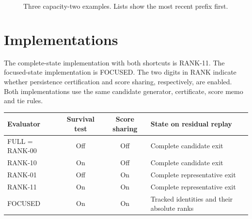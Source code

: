 \documentclass[11pt,letterpaper]{article}
\begin{document}
\begin{figure}[htbp]\centering
{}
\caption{Three capacity-two examples. Lists show the most recent prefix first.}\label{fig:counterexamples}
\end{figure}

\section{Implementations}

The complete-state implementation with both shortcuts is RANK-11. The focused-state implementation is FOCUSED. The two digits in RANK indicate whether persistence certification and score sharing, respectively, are enabled. Both implementations use the same candidate generator, certificate, score memo and tie rules.

\begin{center}\small
\begin{tabularx}{\linewidth}{@{}lccX@{}}
\toprule
Evaluator & Survival test & Score sharing & State on residual replay\\\midrule

FULL = RANK-00 & Off & Off & Complete candidate exit\\

RANK-10 & On & Off & Complete candidate exit\\

RANK-01 & Off & On & Complete representative exit\\

RANK-11 & On & On & Complete representative exit\\

FOCUSED & On & On & Tracked identities and their absolute ranks\\

\bottomrule\end{tabularx}\end{center}
\end{document}
